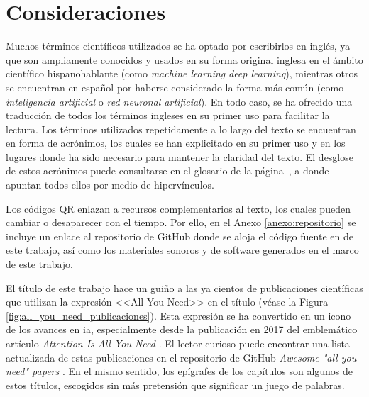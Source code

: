 \section{Consideraciones}


Muchos términos científicos utilizados se ha optado por escribirlos en inglés, ya que son ampliamente conocidos y usados en su forma original inglesa en el ámbito científico hispanohablante (como \emph{machine learning} \emph{deep learning}), mientras otros se encuentran en español por haberse considerado la forma más común (como \emph{inteligencia artificial} o \emph{red neuronal artificial}). En todo caso, se ha ofrecido una traducción de todos los términos ingleses en su primer uso para facilitar la lectura. Los términos utilizados repetidamente a lo largo del texto se encuentran en forma de acrónimos, los cuales se han explicitado en su primer uso y en los lugares donde ha sido necesario para mantener la claridad del texto. El desglose de estos acrónimos puede consultarse en el glosario de la página~\pageref{chap:glosario}, a donde apuntan todos ellos por medio de hipervínculos.

Los códigos QR enlazan a recursos complementarios al texto, los cuales pueden cambiar o desaparecer con el tiempo. Por ello, en el Anexo \ref{anexo:repositorio} se incluye un enlace al repositorio de GitHub donde se aloja el código fuente en  de este trabajo, así como los materiales sonoros y de software generados en el marco de este trabajo.

El título de este trabajo hace un guiño a las ya cientos de publicaciones científicas que utilizan la expresión <<All You Need>> en el título (véase la Figura \ref{fig:all_you_need_publicaciones}). Esta expresión se ha convertido en un icono de los avances en \gls{ia}, especialmente desde la publicación en 2017 del emblemático artículo \emph{Attention Is All You Need} \citep{vaswaniAttentionAllYou2017}. El lector curioso puede encontrar una lista actualizada de estas publicaciones en el repositorio de GitHub \emph{Awesome "all you need" papers} \citep{nishiKentoNishiAwesomeallyouneedpapers2024}. En el mismo sentido, los epígrafes de los capítulos son algunos de estos títulos, escogidos sin más pretensión que significar un juego de palabras.


